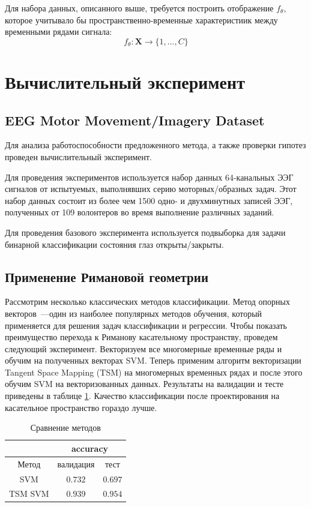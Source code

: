\documentclass[a4paper, 12pt]{extarticle}
\begin{document}
Для набора данных, описанного выше, требуется построить отображение $f_\theta$, которое учитывало 
бы пространственно-временные характеристиик между временными рядами сигнала:
$$f_\theta: \bm{X} \rightarrow \{1,\dots, C\}$$ 




\section{Вычислительный эксперимент}
\subsection{EEG Motor Movement/Imagery Dataset}
Для анализа работоспособности предложенного метода, а также проверки гипотез
проведен вычислительный эксперимент.

Для проведения экспериментов используется набор данных \citep{schalk2004bci2000} 64-канальных ЭЭГ сигналов от испытуемых, 
выполнявших серию моторных/образных задач. Этот набор данных состоит из более 
чем 1500 одно- и двухминутных записей ЭЭГ, полученных от 109 волонтеров во время выполнение различных заданий. 
 
Для проведения базового эксперимента используется подвыборка для задачи бинарной классификации состояния глаз открыты/закрыты.

\subsection*{Применение Римановой геометрии}
Рассмотрим несколько классических методов классификации. 
Метод опорных векторов~---один из наиболее популярных методов обучения, который применяется для решения задач классификации и регрессии.
Чтобы показать преимущество перехода к Риманову касательному пространству, проведем следующий эксперимент. 
Векторизуем все многомерные временные ряды и обучим на полученных векторах SVM. 
Теперь применим алгоритм векторизации Tangent Space Mapping (TSM) на многомерных временных рядах и после этого обучим SVM на векторизованных данных. 
Результаты на валидации и тесте приведены в таблице \ref{table:Riman}. 
Качество классификации после проектирования на касательное пространство гораздо лучше.

\begin{table}[h!]
	\centering
	\caption{Сравнение методов}
	\begin{tabular}{|c|c|c|}
		\hline
		& \multicolumn{2}{|c|}{accuracy}  \\ \hline 
		Метод & валидация  & тест \\ \hline \hline
		SVM    & $0.732$ & $0.697$      \\ \hline
		TSM SVM    & $0.939$ & $0.954$		\\ \hline
	\end{tabular}
	\label{table:Riman}
\end{table}
\end{document}
